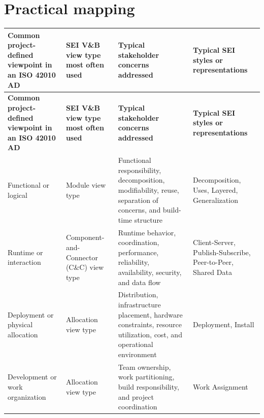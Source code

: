 \documentclass[11pt]{article}
\begin{document}
\section*{Practical mapping}
\begingroup\footnotesize
\begin{longtable}{@{}P{0.20\textwidth} P{0.17\textwidth} P{0.28\textwidth} P{0.15\textwidth}@{}}
\toprule
\textbf{Common project-defined viewpoint in an ISO 42010 AD} & \textbf{SEI V\&B view type most often used} & \textbf{Typical stakeholder concerns addressed} & \textbf{Typical SEI styles or representations} \\
\midrule
\endfirsthead
\toprule
\textbf{Common project-defined viewpoint in an ISO 42010 AD} & \textbf{SEI V\&B view type most often used} & \textbf{Typical stakeholder concerns addressed} & \textbf{Typical SEI styles or representations} \\
\midrule
\endhead
Functional or logical & Module view type & Functional responsibility, decomposition, modifiability, reuse, separation of concerns, and build-time structure & Decomposition, Uses, Layered, Generalization \\
Runtime or interaction & Component-and-Connector (C\&C) view type & Runtime behavior, coordination, performance, reliability, availability, security, and data flow & Client-Server, Publish-Subscribe, Peer-to-Peer, Shared Data \\
Deployment or physical allocation & Allocation view type & Distribution, infrastructure placement, hardware constraints, resource utilization, cost, and operational environment & Deployment, Install \\
Development or work organization & Allocation view type & Team ownership, work partitioning, build responsibility, and project coordination & Work Assignment \\
\bottomrule
\end{longtable}
\endgroup
\end{document}
